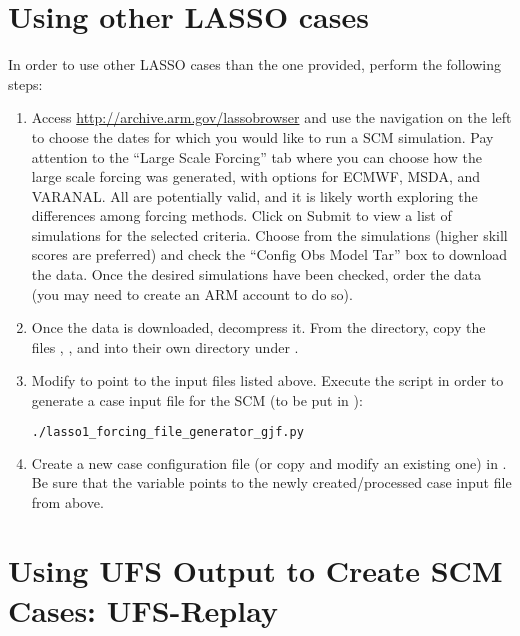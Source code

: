 \section{Using other LASSO cases}
\label{sec:lasso}

In order to use other LASSO cases than the one provided, perform the following steps:
\begin{enumerate}
\item Access \url{http://archive.arm.gov/lassobrowser} and use the navigation on the left to choose the dates for which you would like to run a SCM simulation. Pay attention to the ``Large Scale Forcing'' tab where you can choose how the large scale forcing was generated, with options for ECMWF, MSDA, and VARANAL. All are potentially valid, and it is likely worth exploring the differences among forcing methods. Click on Submit to view a list of simulations for the selected criteria. Choose from the simulations (higher skill scores are preferred) and check the ``Config Obs Model Tar'' box to download the data. Once the desired simulations have been checked, order the data (you may need to create an ARM account to do so).
\item Once the data is downloaded, decompress it. From the  directory, copy the files , , and  into their own directory under .
\item Modify  to point to the input files listed above. Execute the script in order to generate a case input file for the SCM (to be put in ):
\begin{lstlisting}[language=bash]
./lasso1_forcing_file_generator_gjf.py
\end{lstlisting}
\item Create a new case configuration file (or copy and modify an existing one) in . Be sure that the  variable points to the newly created/processed case input file from above.
\end{enumerate}

\section{Using UFS Output to Create SCM Cases: UFS-Replay}
\label{sec:UFSreplay}


